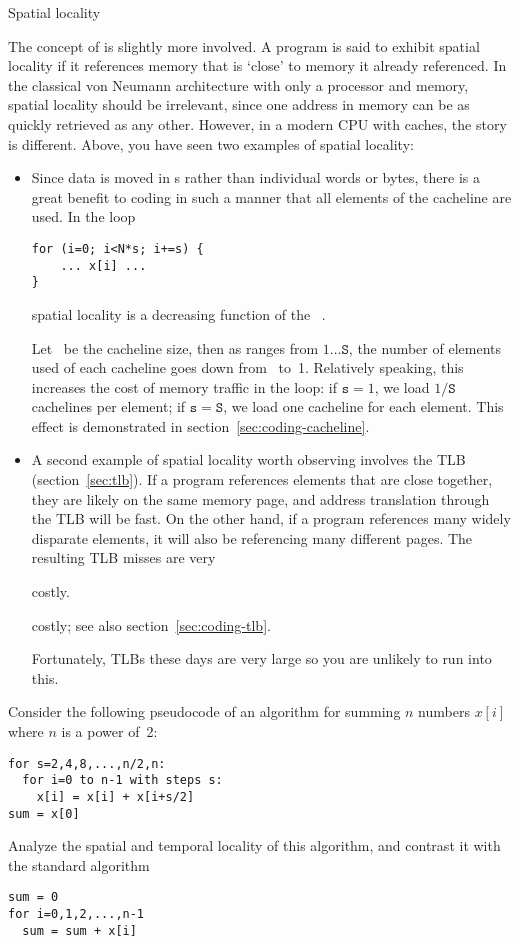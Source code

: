  {Spatial locality}

The concept of  is slightly more
involved. A program is said to exhibit spatial locality if it
references memory that is `close' to memory it already referenced. In
the classical von Neumann architecture with only a processor and
memory, spatial locality should be irrelevant, since one address in
memory can be as quickly  retrieved as any other. However, in a modern \ac{CPU}
with caches, the story is different. Above, you have seen two examples
of spatial locality:
\begin{itemize}
\item Since data is moved in s rather than
  individual words or bytes,
  there is a great benefit to coding in such a manner that all
  elements of the cacheline are used. In the loop
\begin{lstlisting}
for (i=0; i<N*s; i+=s) {
    ... x[i] ...
}
\end{lstlisting}
  spatial locality is a decreasing function of the
  ~.

  Let ~be the cacheline size, then as  ranges from $1\ldots\mathtt{S}$,
  the number of elements used of each cacheline goes
  down from~ to~1. Relatively speaking, this increases the cost
  of memory traffic in the loop: if $\mathtt{s}=1$, we load $1/\mathtt{S}$ cachelines
  per element; if $\mathtt{s}=\mathtt{S}$, we load one cacheline for each element. This
  effect is demonstrated in section~\ref{sec:coding-cacheline}.
\item A second example of spatial locality worth observing involves
  the \ac{TLB} (section~\ref{sec:tlb}). If a program references
  elements that are close together, they are likely on the same memory
  page, and address translation through the TLB will be fast. On the
  other hand, if a program references many widely disparate elements,
  it will also be referencing many different pages.
  The resulting TLB
  misses are very
\begin{packt}
    costly.
\end{packt}
\begin{nopackt}
    costly; see also section~\ref{sec:coding-tlb}.
\end{nopackt}
Fortunately, \acp{TLB} these days are very large so you are
unlikely to run into this.
\end{itemize}


\begin{exercise}
  Consider the following pseudocode of an algorithm for summing $n$
  numbers $x[i]$ where $n$ is a power of~2:
\begin{lstlisting}
for s=2,4,8,...,n/2,n:
  for i=0 to n-1 with steps s:
    x[i] = x[i] + x[i+s/2]
sum = x[0]
\end{lstlisting}
  Analyze the spatial and temporal locality of this algorithm, and
  contrast it with the standard algorithm
\begin{lstlisting}
sum = 0
for i=0,1,2,...,n-1
  sum = sum + x[i]
\end{lstlisting}
\end{exercise}

